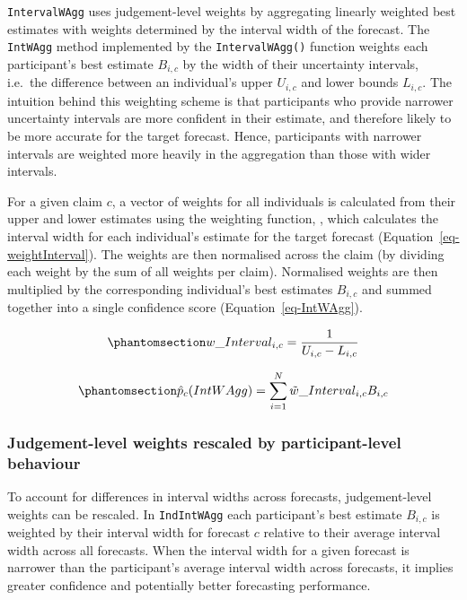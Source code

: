 \documentclass[
  11pt,
  a4paper,
]{article}
\begin{document}
\texttt{IntervalWAgg} uses judgement-level weights by aggregating
linearly weighted best estimates with weights determined by the interval
width of the forecast. The \texttt{IntWAgg} method implemented by the
\texttt{IntervalWAgg()} function weights each participant's best
estimate \(B_{i,c}\) by the width of their uncertainty intervals,
i.e.~the difference between an individual's upper \({U}_{i,c}\) and
lower bounds \({L}_{i,c}\). The intuition behind this weighting scheme
is that participants who provide narrower uncertainty intervals are more
confident in their estimate, and therefore likely to be more accurate
for the target forecast. Hence, participants with narrower intervals are
weighted more heavily in the aggregation than those with wider
intervals.

For a given claim \(c\), a vector of weights for all individuals is
calculated from their upper and lower estimates using the weighting
function, , which calculates the interval width for
each individual's estimate for the target forecast
(Equation~\ref{eq-weightInterval}). The weights are then normalised
across the claim (by dividing each weight by the sum of all weights per
claim). Normalised weights are then multiplied by the corresponding
individual's best estimates \(B_{i,c}\) and summed together into a
single confidence score (Equation~\ref{eq-IntWAgg}).

\begin{equation}\protect\phantomsection\label{eq-weightInterval}{
w\_Interval_{i,c} = \frac{1}{U_{i,c} - L_{i,c}}
}\end{equation}

\begin{equation}\protect\phantomsection\label{eq-IntWAgg}{
\hat{p}_c(IntWAgg) = \sum_{i=1}^N \tilde{w}\_Interval_{i,c}B_{i,c}
}\end{equation}

\subsubsection{Judgement-level weights rescaled by participant-level
behaviour}\label{sec-IndIntWAgg}

To account for differences in interval widths across forecasts,
judgement-level weights can be rescaled. In \texttt{IndIntWAgg} each
participant's best estimate \(B_{i,c}\) is weighted by their interval
width for forecast \(c\) relative to their average interval width across
all forecasts. When the interval width for a given forecast is narrower
than the participant's average interval width across forecasts, it
implies greater confidence and potentially better forecasting
performance.
\end{document}

